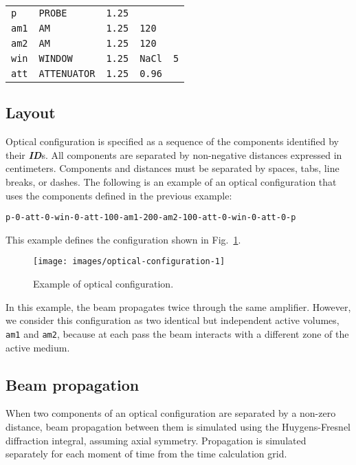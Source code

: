 \documentclass{report}
\begin{document}
\bigskip
\begin{tabular}{lllll}
\texttt{p}   & \texttt{PROBE}      & \texttt{1.25} &               &           \\
\texttt{am1} & \texttt{AM}         & \texttt{1.25} & \texttt{120}  &           \\
\texttt{am2} & \texttt{AM}         & \texttt{1.25} & \texttt{120}  &           \\
\texttt{win} & \texttt{WINDOW}     & \texttt{1.25} & \texttt{NaCl} & \texttt{5}\\
\texttt{att} & \texttt{ATTENUATOR} & \texttt{1.25} & \texttt{0.96} &
\end{tabular}

\subsection{Layout}
Optical configuration is specified as a sequence of the components identified by their \textit{\textbf{ID}}s. All components are separated by non-negative distances expressed in centimeters. Components and distances must be separated by spaces, tabs, line breaks, or dashes. The following is an example of an optical configuration that uses the components defined in the previous example:

\bigskip
\texttt{p-0-att-0-win-0-att-100-am1-200-am2-100-att-0-win-0-att-0-p }
\bigskip

This example defines the configuration shown in Fig.~\ref{fig:optical-configuration-1}.

\begin{figure}[ht]
\centering
\texttt{[image: images/optical-configuration-1]}
\caption{Example of optical configuration.}\label{fig:optical-configuration-1}
\end{figure}

In this example, the beam propagates twice through the same amplifier. However, we consider this configuration as two identical but independent active volumes, \texttt{am1} and \texttt{am2}, because at each pass the beam interacts with a different zone of the active medium.

\subsection{Beam propagation}
When two components of an optical configuration are separated by a non-zero distance, beam propagation between them is simulated using the Huygens-Fresnel diffraction integral, assuming axial symmetry. Propagation is simulated separately for each moment of time from the time calculation grid.
\end{document}
